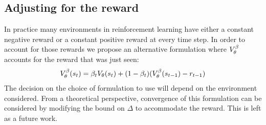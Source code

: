 \subsection{Adjusting for the reward}
In practice many environments in reinforcement learning have either a constant negative reward or a constant positive reward at every time step. In order to account for those rewards we propose an alternative formulation where $V^{\beta}_{\theta}$ accounts for the reward that was just seen:
\begin{equation}
\label{value_reward}
\begin{split}
    V^{\beta}_{\theta}(s_t) &= \beta_t V_{\theta}(s_t) + (1 - \beta_t) (V^{\beta}_{\theta}(s_{t-1}) - r_{t-1}) \\ 
\end{split}
\end{equation}
The decision on the choice of formulation to use will depend on the environment considered. 
From a theoretical perspective, convergence of this formulation can be considered by modifying the bound on $\Delta$ to accommodate the reward. This is left as a future work. 
